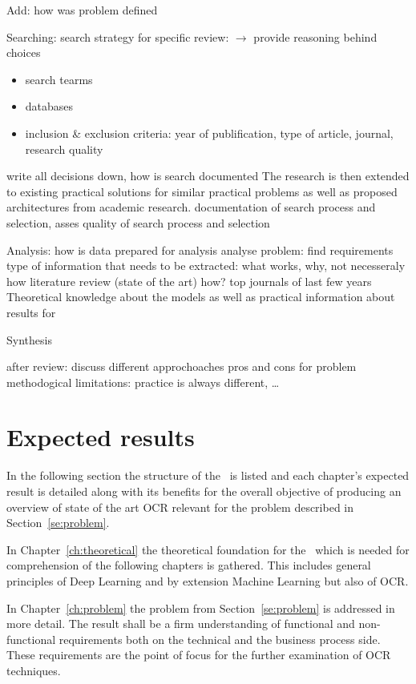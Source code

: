 Add: how was problem defined

Searching:
search strategy for specific review: $\rightarrow$ provide reasoning behind choices
\begin{itemize}
    \item search tearms
    \item databases
    \item inclusion \& exclusion criteria: year of publification, type of article, journal, research
        quality
\end{itemize}
write all decisions down, how is search documented
The research is then extended to existing practical solutions for similar practical problems as
well as proposed architectures from academic research.
documentation of search process and selection, asses quality of search process and selection

Analysis:
how is data prepared for analysis
analyse problem: find requirements
type of information that needs to be extracted: what works, why, not necesseraly how
literature review (state of the art)
how? top journals of last few years
Theoretical knowledge about the models as well as practical information about results for

Synthesis

after review:
discuss different approchoaches pros and cons for problem
methodogical limitations: practice is always different, \ldots

\section{Expected results}
In the following section the structure of the \the\arbeit\ is listed and each chapter's expected
result is detailed along with its benefits for the overall objective of producing an overview of
state of the art OCR relevant for the problem described in Section~\ref{se:problem}.

In Chapter~\ref{ch:theoretical} the theoretical foundation for the \the\arbeit\ which is needed for
comprehension of the following chapters is gathered.
This includes general principles of Deep Learning and by extension Machine Learning but also of OCR.

In Chapter~\ref{ch:problem} the problem from Section~\ref{se:problem} is addressed in more detail.
The result shall be a firm understanding of functional and non-functional requirements both on the
technical and the business process side.
These requirements are the point of focus for the further examination of OCR techniques.

